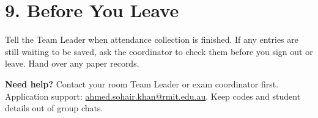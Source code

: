 \documentclass[10pt,a4paper]{article}
\begin{document}
\section*{9. Before You Leave}
Tell the Team Leader when attendance collection is finished. If any entries are still waiting to be saved, ask the coordinator to check them before you sign out or leave. Hand over any paper records.\par
\textbf{Need help?} Contact your room Team Leader or exam coordinator first. Application support: \href{mailto:ahmed.sohair.khan@rmit.edu.au}{ahmed.sohair.khan@rmit.edu.au}. Keep codes and student details out of group chats.\par
\end{document}

